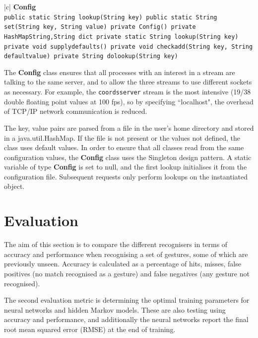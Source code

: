 \documentclass[12pt,a4,notitlepage]{report}
\renewcommand{\_}{\texttt{\symbol{95}}}
\newcommand{\<}{\texttt{\symbol{60}}}
\renewcommand{\>}{\texttt{\symbol{62}}}
\newcommand{\class}[1]{\textbf{#1}}
\newcommand{\scopendpoint}[1]{\texttt{#1}}
\newcommand{\variable}[1]{\texttt{#1}}
\begin{document}
\begin{tabular}{|c|} \hline 
\class{Config} \\ \hline
{}
{\variable{public static String lookup(String key) \newline
public static String set(String key, String value) \newline
private Config() \newline
private HashMap\<String,String\> dict \newline
private static String lookup(String key) \newline
private void supply\_defaults() \newline
private void check\_add(String key, String defaultvalue) \newline
private String do\_lookup(String key)
} } \\ \hline
\end{tabular}

The \class{Config} class ensures that all processes with an interest in a stream are talking to the same server, and to allow the three streams to use different sockets as necessary. For example, the \scopendpoint{coordsserver} stream is the most intensive (19/38 double floating point values at 100 fps), so by specifying ``localhost", the overhead of TCP/IP network communication is reduced.

The \<key, value\> pairs are parsed from a file in the user's home directory and stored in a java.util.HashMap. If the file is not present or the values not defined, the class uses default values. In order to ensure that all classes read from the same configuration values, the \class{Config} class uses the Singleton design pattern. A static variable of type \class{Config} is set to null, and the first lookup initialises it from the configuration file. Subsequent requests only perform lookups on the instantiated object.

\chapter{Evaluation}

The aim of this section is to compare the different recognisers in terms of accuracy and performance when recognising a set of gestures, some of which are previously unseen. Accuracy is calculated as a percentage of hits, misses, false positives (no match recognised as a gesture) and false negatives (any gesture not recognised).

The second evaluation metric is determining the optimal training parameters for neural networks and hidden Markov models. These are also testing using accuracy and performance, and additionally the neural networks report the final root mean squared error (RMSE) at the end of training.
\end{document}
